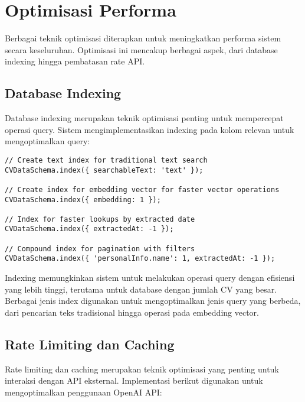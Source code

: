\section{Optimisasi Performa}
Berbagai teknik optimisasi diterapkan untuk meningkatkan performa sistem secara keseluruhan. Optimisasi ini mencakup berbagai aspek, dari database indexing hingga pembatasan rate API.

\subsection{Database Indexing}
Database indexing merupakan teknik optimisasi penting untuk mempercepat operasi query. Sistem mengimplementasikan indexing pada kolom relevan untuk mengoptimalkan query:

\begin{verbatim}
// Create text index for traditional text search
CVDataSchema.index({ searchableText: 'text' });

// Create index for embedding vector for faster vector operations
CVDataSchema.index({ embedding: 1 });

// Index for faster lookups by extracted date
CVDataSchema.index({ extractedAt: -1 });

// Compound index for pagination with filters
CVDataSchema.index({ 'personalInfo.name': 1, extractedAt: -1 });
\end{verbatim}

Indexing memungkinkan sistem untuk melakukan operasi query dengan efisiensi yang lebih tinggi, terutama untuk database dengan jumlah CV yang besar. Berbagai jenis index digunakan untuk mengoptimalkan jenis query yang berbeda, dari pencarian teks tradisional hingga operasi pada embedding vector.

\subsection{Rate Limiting dan Caching}
Rate limiting dan caching merupakan teknik optimisasi yang penting untuk interaksi dengan API eksternal. Implementasi berikut digunakan untuk mengoptimalkan penggunaan OpenAI API:

